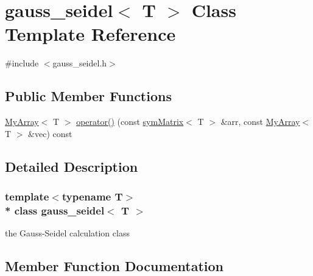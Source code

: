 \hypertarget{classgauss__seidel}{}\section{gauss\+\_\+seidel$<$ T $>$ Class Template Reference}
\label{classgauss__seidel}


{\ttfamily \#include $<$gauss\+\_\+seidel.\+h$>$}

\subsection*{Public Member Functions}
\begin{DoxyCompactItemize}
\item 
\hyperlink{classMyArray}{My\+Array}$<$ T $>$ \hyperlink{classgauss__seidel_a09ebc3c2c01756a862ef6c27a513ee78}{operator()} (const \hyperlink{classsymMatrix}{sym\+Matrix}$<$ T $>$ \&arr, const \hyperlink{classMyArray}{My\+Array}$<$ T $>$ \&vec) const 
\end{DoxyCompactItemize}


\subsection{Detailed Description}
\subsubsection*{template$<$typename T$>$\\*
class gauss\+\_\+seidel$<$ T $>$}

the Gauss-\/\+Seidel calculation class 

\subsection{Member Function Documentation}
